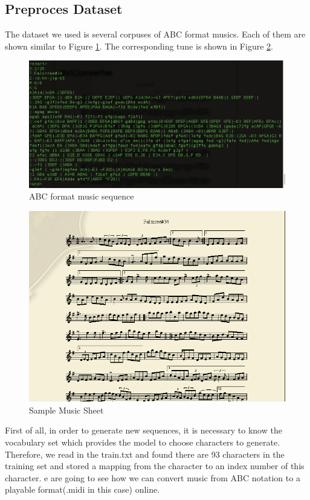\documentclass{article}
\begin{document}
\subsection{Preproces Dataset}
The dataset we used is several corpuses of ABC format musics. Each of them are shown similar to Figure \ref{figure: ABC format}. The corresponding tune is shown in Figure \ref{figure: tune}.
\begin{figure}[H]
\begin{center}
\includegraphics[scale=0.4]{image/music.png}
\end{center}
\caption{ABC format music sequence}
\label{figure: ABC format}
\end{figure}
\begin{figure}[H]
\begin{center}
\includegraphics[scale=0.4]{image/tune.png}
\end{center}
\caption{Sample Music Sheet}
\label{figure: tune}
\end{figure}
First of all, in order to generate new sequences, it is necessary to know the vocabulary set which provides the model to choose characters to generate. Therefore, we read in the train.txt and found there are 93 characters in the training set and stored a mapping from the character to an index number of this character.
e are going to see how we can convert music from ABC notation to a playable format(.midi in this case) online.
\end{document}
